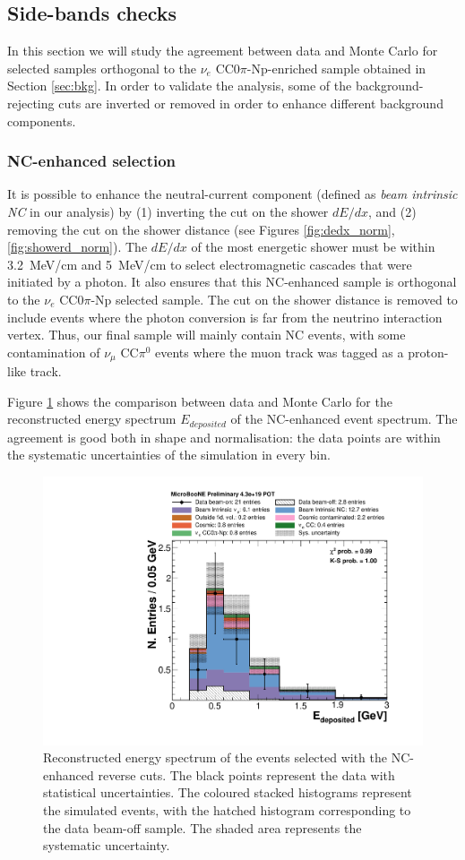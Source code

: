 \subsection{Side-bands checks}
In this section we will study the agreement between data and Monte Carlo for selected samples orthogonal to the $\nu_{e}$ CC0$\pi$-Np-enriched sample obtained in Section \ref{sec:bkg}. In order to validate the analysis, some of the background-rejecting cuts are inverted or removed in order to enhance different background components.
\subsubsection{NC-enhanced selection}
It is possible to enhance the neutral-current component (defined as \emph{beam intrinsic NC} in our analysis) by (1) inverting the cut on the shower $dE/dx$, and (2) removing the cut on the shower distance (see Figures \ref{fig:dedx_norm}, \ref{fig:showerd_norm}). The $dE/dx$ of the most energetic shower must be within 3.2~MeV/cm and 5~MeV/cm to select electromagnetic cascades that were initiated by a photon. It also ensures that this NC-enhanced sample is orthogonal to the $\nu_{e}$ CC0$\pi$-Np selected sample. The cut on the shower distance is removed to include events where the photon conversion is far from the neutrino interaction vertex.
Thus, our final sample will mainly contain NC events, with some contamination of $\nu_{\mu}$ CC$\pi^{0}$ events where the muon track was tagged as a proton-like track.

Figure \ref{fig:photon} shows the comparison between data and Monte Carlo for the reconstructed energy spectrum $E_{deposited}$ of the NC-enhanced event spectrum. The agreement is good both in shape and normalisation: the data points are within the systematic uncertainties of the simulation in every bin.

\begin{figure}[htbp]
\centering
  \includegraphics[width=0.7\linewidth]{figures/nc_reco.pdf}
  \caption{Reconstructed energy spectrum of the events selected with the NC-enhanced reverse cuts. The black points represent the data with statistical uncertainties. The coloured stacked histograms represent the simulated events, with the hatched histogram corresponding to the data beam-off sample. The shaded area represents the systematic uncertainty.}\label{fig:photon}
\end{figure}

